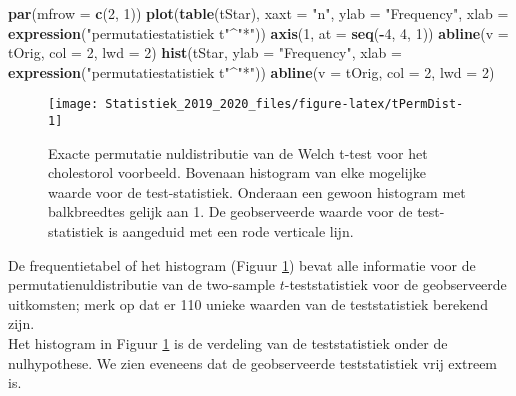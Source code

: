 \documentclass[12pt,dutch,coursenotes]{book}
\newenvironment{Shaded}{\begin{snugshade}}{\end{snugshade}}
\newcommand{\KeywordTok}[1]{\textcolor[rgb]{0.13,0.29,0.53}{\textbf{#1}}}
\newcommand{\DataTypeTok}[1]{\textcolor[rgb]{0.13,0.29,0.53}{#1}}
\newcommand{\DecValTok}[1]{\textcolor[rgb]{0.00,0.00,0.81}{#1}}
\newcommand{\StringTok}[1]{\textcolor[rgb]{0.31,0.60,0.02}{#1}}
\newcommand{\OperatorTok}[1]{\textcolor[rgb]{0.81,0.36,0.00}{\textbf{#1}}}
\newcommand{\NormalTok}[1]{#1}
\theoremstyle{definition}
\theoremstyle{definition}
\theoremstyle{definition}
\theoremstyle{remark}
\begin{document}
\begin{Shaded}
\begin{Highlighting}[]
\KeywordTok{par}\NormalTok{(}\DataTypeTok{mfrow =} \KeywordTok{c}\NormalTok{(}\DecValTok{2}\NormalTok{, }\DecValTok{1}\NormalTok{))}
\KeywordTok{plot}\NormalTok{(}\KeywordTok{table}\NormalTok{(tStar), }\DataTypeTok{xaxt =} \StringTok{"n"}\NormalTok{, }\DataTypeTok{ylab =} \StringTok{"Frequency"}\NormalTok{, }
    \DataTypeTok{xlab =} \KeywordTok{expression}\NormalTok{(}\StringTok{"permutatiestatistiek t"}\OperatorTok{^}\StringTok{"*"}\NormalTok{))}
\KeywordTok{axis}\NormalTok{(}\DecValTok{1}\NormalTok{, }\DataTypeTok{at =} \KeywordTok{seq}\NormalTok{(}\OperatorTok{-}\DecValTok{4}\NormalTok{, }\DecValTok{4}\NormalTok{, }\DecValTok{1}\NormalTok{))}
\KeywordTok{abline}\NormalTok{(}\DataTypeTok{v =}\NormalTok{ tOrig, }\DataTypeTok{col =} \DecValTok{2}\NormalTok{, }\DataTypeTok{lwd =} \DecValTok{2}\NormalTok{)}
\KeywordTok{hist}\NormalTok{(tStar, }\DataTypeTok{ylab =} \StringTok{"Frequency"}\NormalTok{, }\DataTypeTok{xlab =} \KeywordTok{expression}\NormalTok{(}\StringTok{"permutatiestatistiek t"}\OperatorTok{^}\StringTok{"*"}\NormalTok{))}
\KeywordTok{abline}\NormalTok{(}\DataTypeTok{v =}\NormalTok{ tOrig, }\DataTypeTok{col =} \DecValTok{2}\NormalTok{, }\DataTypeTok{lwd =} \DecValTok{2}\NormalTok{)}
\end{Highlighting}
\end{Shaded}

\begin{figure}

{\centering \texttt{[image: Statistiek\_2019\_2020\_files/figure-latex/tPermDist-1]} 

}

\caption{Exacte permutatie nuldistributie van de Welch t-test voor het cholestorol voorbeeld. Bovenaan histogram van elke mogelijke waarde voor de test-statistiek. Onderaan een gewoon histogram met balkbreedtes gelijk aan 1. De geobserveerde waarde voor de test-statistiek is aangeduid met een rode verticale lijn.}\label{fig:tPermDist}
\end{figure}

De frequentietabel of het histogram (Figuur \ref{fig:tPermDist}) bevat
alle informatie voor de permutatienuldistributie van de two-sample
\(t\)-teststatistiek voor de geobserveerde uitkomsten; merk op dat er
110 unieke waarden van de teststatistiek berekend zijn.\\
Het histogram in Figuur \ref{fig:tPermDist} is de verdeling van de
teststatistiek onder de nulhypothese. We zien eveneens dat de
geobserveerde teststatistiek vrij extreem is.
\end{document}
